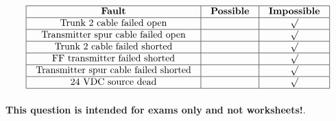 






$$\vbox{\offinterlineskip
\halign{\strut
\vrule \quad\hfil # \ \hfil & 
\vrule \quad\hfil # \ \hfil & 
\vrule \quad\hfil # \ \hfil \vrule \cr
\noalign{\hrule}
%
{\bf Fault} & {\bf Possible} & {\bf Impossible} \cr
%
%
%
\noalign{\hrule}
%
Trunk 2 cable failed open &  & $\surd$ \cr
%
\noalign{\hrule}
%
Transmitter spur cable failed open &  & $\surd$ \cr
%
%
%
%
%
\noalign{\hrule}
%
Trunk 2 cable failed shorted &  & $\surd$ \cr
%
\noalign{\hrule}
%
FF transmitter failed shorted &  & $\surd$ \cr
%
%
%
\noalign{\hrule}
%
Transmitter spur cable failed shorted &  & $\surd$ \cr
%
%
%
\noalign{\hrule}
%
24 VDC source dead &  & $\surd$ \cr
%
\noalign{\hrule}
} %
}$$ %








{\bf This question is intended for exams only and not worksheets!}.



